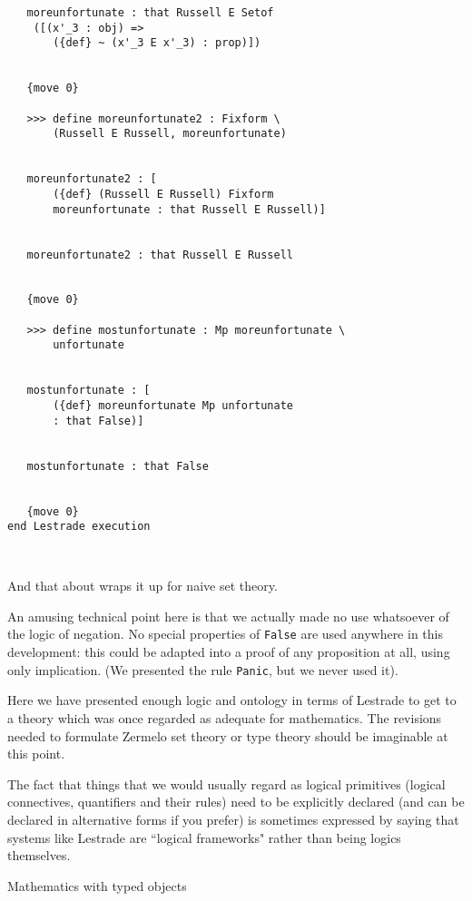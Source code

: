 \documentclass{slides}
\begin{document}
{\begin{slide}
{\begin{verbatim}
   moreunfortunate : that Russell E Setof 
    ([(x'_3 : obj) => 
       ({def} ~ (x'_3 E x'_3) : prop)])


   {move 0}

   >>> define moreunfortunate2 : Fixform \
       (Russell E Russell, moreunfortunate)


   moreunfortunate2 : [
       ({def} (Russell E Russell) Fixform 
       moreunfortunate : that Russell E Russell)]


   moreunfortunate2 : that Russell E Russell


   {move 0}

   >>> define mostunfortunate : Mp moreunfortunate \
       unfortunate


   mostunfortunate : [
       ({def} moreunfortunate Mp unfortunate 
       : that False)]


   mostunfortunate : that False


   {move 0}
end Lestrade execution



\end{verbatim}
}

\end{slide}
\begin{slide}
\small
And that about wraps it up for naive set theory.

An amusing technical point here is that we actually made no use whatsoever of the logic of negation. No special properties of {\tt False} are used anywhere in this development:  this could be adapted into a proof of any proposition at all, using only implication.  (We presented the rule {\tt Panic}, but we never used it).

Here we have presented enough logic and ontology in terms of Lestrade to get to a theory which was once regarded as adequate for mathematics.  The revisions needed to formulate Zermelo set theory or type theory should be imaginable at this point.

The fact that things that we would usually regard as logical primitives (logical connectives, quantifiers and their rules) need to be explicitly declared (and can be declared in alternative forms if you prefer) is sometimes expressed by saying that systems like Lestrade are ``logical frameworks" rather than being logics themselves.


\end{slide}

\begin{slide}

{\Large Mathematics with typed objects}


\end{slide}}
\end{document}
